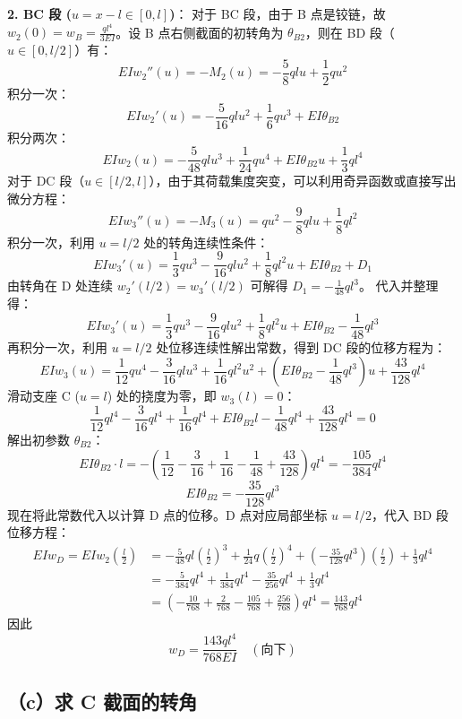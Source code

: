 \documentclass[UTF8,fontset=windows]{ctexart}
\begin{document}
\textbf{2. BC 段 ($u = x-l \in [0, l]$)}：
对于 BC 段，由于 B 点是铰链，故 $w_2(0) = w_B = \frac{ql^4}{3EI}$。设 B 点右侧截面的初转角为 $\theta_{B2}$，则在 BD 段（$u \in [0, l/2]$）有：
\[
    EI w_2''(u) = -M_2(u) = -\frac{5}{8} qlu + \frac{1}{2} qu^2
\]
积分一次：
\[
    EI w_2'(u) = -\frac{5}{16} ql u^2 + \frac{1}{6} q u^3 + EI \theta_{B2}
\]
积分两次：
\[
    EI w_2(u) = -\frac{5}{48} ql u^3 + \frac{1}{24} q u^4 + EI \theta_{B2} u + \frac{1}{3} ql^4
\]
对于 DC 段（$u \in [l/2, l]$），由于其荷载集度突变，可以利用奇异函数或直接写出微分方程：
\[
    EI w_3''(u) = -M_3(u) = qu^2 - \frac{9}{8} qlu + \frac{1}{8} ql^2
\]
积分一次，利用 $u=l/2$ 处的转角连续性条件：
\[
    EI w_3'(u) = \frac{1}{3} q u^3 - \frac{9}{16} ql u^2 + \frac{1}{8} ql^2 u + EI \theta_{B2} + D_1
\]
由转角在 D 处连续 $w_2'(l/2) = w_3'(l/2)$ 可解得 $D_1 = -\frac{1}{48} ql^3$。
代入并整理得：
\[
    EI w_3'(u) = \frac{1}{3} q u^3 - \frac{9}{16} ql u^2 + \frac{1}{8} ql^2 u + EI \theta_{B2} - \frac{1}{48} ql^3
\]
再积分一次，利用 $u=l/2$ 处位移连续性解出常数，得到 DC 段的位移方程为：
\[
    EI w_3(u) = \frac{1}{12} q u^4 - \frac{3}{16} ql u^3 + \frac{1}{16} ql^2 u^2 + \left(EI\theta_{B2} - \frac{1}{48}ql^3\right) u + \frac{43}{128} ql^4
\]
滑动支座 C ($u=l$) 处的挠度为零，即 $w_3(l) = 0$：
\[
    \frac{1}{12} q l^4 - \frac{3}{16} q l^4 + \frac{1}{16} q l^4 + EI \theta_{B2} l - \frac{1}{48} ql^4 + \frac{43}{128} ql^4 = 0
\]
解出初参数 $\theta_{B2}$：
\[
    EI \theta_{B2} \cdot l = - \left( \frac{1}{12} - \frac{3}{16} + \frac{1}{16} - \frac{1}{48} + \frac{43}{128} \right) ql^4 = - \frac{105}{384} ql^4
\]
\[
    EI \theta_{B2} = -\frac{35}{128} ql^3
\]
现在将此常数代入以计算 D 点的位移。D 点对应局部坐标 $u = l/2$，代入 BD 段位移方程：
\[
    \begin{aligned}
        EI w_D = EI w_2\left(\frac{l}{2}\right) &= -\frac{5}{48} ql \left(\frac{l}{2}\right)^3 + \frac{1}{24} q \left(\frac{l}{2}\right)^4 + \left(-\frac{35}{128} ql^3\right) \left(\frac{l}{2}\right) + \frac{1}{3} ql^4 \\
        &= -\frac{5}{384} ql^4 + \frac{1}{384} ql^4 - \frac{35}{256} ql^4 + \frac{1}{3} ql^4 \\
        &= \left( -\frac{10}{768} + \frac{2}{768} - \frac{105}{768} + \frac{256}{768} \right) ql^4 = \frac{143}{768} ql^4
    \end{aligned}
\]
因此
\[
    w_D = \frac{143ql^4}{768EI} \quad (\text{向下})
\]

\subsection*{（c）求 C 截面的转角}
\end{document}
